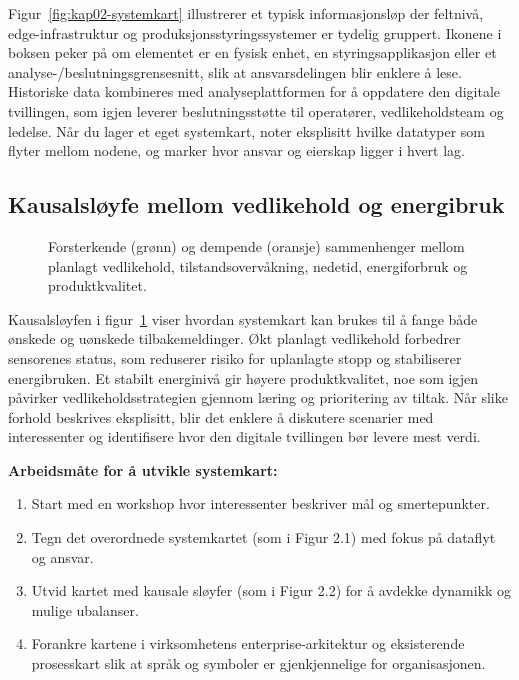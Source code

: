 Figur~\ref{fig:kap02-systemkart} illustrerer et typisk informasjonsløp der feltnivå, edge-infrastruktur og produksjonsstyringssystemer er tydelig gruppert. Ikonene i boksen peker på om elementet er en fysisk enhet, en styringsapplikasjon eller et analyse-/beslutningsgrensesnitt, slik at ansvarsdelingen blir enklere å lese. Historiske data kombineres med analyseplattformen for å oppdatere den digitale tvillingen, som igjen leverer beslutningsstøtte til operatører, vedlikeholdsteam og ledelse. Når du lager et eget systemkart, noter eksplisitt hvilke datatyper som flyter mellom nodene, og marker hvor ansvar og eierskap ligger i hvert lag.

\subsection{Kausalsløyfe mellom vedlikehold og energibruk}
\begin{figure}[ht]
    \centering
    \resizebox{0.92\textwidth}{!}{}
    \caption{Forsterkende (grønn) og dempende (oransje) sammenhenger mellom planlagt vedlikehold, tilstandsovervåkning, nedetid, energiforbruk og produktkvalitet.}
    \label{fig:kap02-kausal}
\end{figure}

Kausalsløyfen i figur~\ref{fig:kap02-kausal} viser hvordan systemkart kan brukes til å fange både ønskede og uønskede tilbakemeldinger. Økt planlagt vedlikehold forbedrer sensorenes status, som reduserer risiko for uplanlagte stopp og stabiliserer energibruken. Et stabilt energinivå gir høyere produktkvalitet, noe som igjen påvirker vedlikeholdsstrategien gjennom læring og prioritering av tiltak. Når slike forhold beskrives eksplisitt, blir det enklere å diskutere scenarier med interessenter og identifisere hvor den digitale tvillingen bør levere mest verdi.

\textbf{Arbeidsmåte for å utvikle systemkart:}
\begin{enumerate}
    \item Start med en workshop hvor interessenter beskriver mål og smertepunkter.
    \item Tegn det overordnede systemkartet (som i Figur 2.1) med fokus på dataflyt og ansvar.
    \item Utvid kartet med kausale sløyfer (som i Figur 2.2) for å avdekke dynamikk og mulige ubalanser.
    \item Forankre kartene i virksomhetens enterprise-arkitektur og eksisterende prosesskart slik at språk og symboler er gjenkjennelige for organisasjonen.
\end{enumerate}

